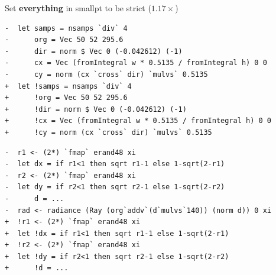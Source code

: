 \documentclass[8pt]{beamer}
\begin{document}
\begin{frame}[fragile]{Set \textbf{everything} in smallpt to be strict ($1.17\times$)}
\begin{verbatim}
-  let samps = nsamps `div` 4
-      org = Vec 50 52 295.6
-      dir = norm $ Vec 0 (-0.042612) (-1)
-      cx = Vec (fromIntegral w * 0.5135 / fromIntegral h) 0 0
-      cy = norm (cx `cross` dir) `mulvs` 0.5135
+  let !samps = nsamps `div` 4
+      !org = Vec 50 52 295.6
+      !dir = norm $ Vec 0 (-0.042612) (-1)
+      !cx = Vec (fromIntegral w * 0.5135 / fromIntegral h) 0 0
+      !cy = norm (cx `cross` dir) `mulvs` 0.5135
\end{verbatim}

\begin{verbatim}
-  r1 <- (2*) `fmap` erand48 xi
-  let dx = if r1<1 then sqrt r1-1 else 1-sqrt(2-r1)
-  r2 <- (2*) `fmap` erand48 xi
-  let dy = if r2<1 then sqrt r2-1 else 1-sqrt(2-r2)
-      d = ...
-  rad <- radiance (Ray (org`addv`(d`mulvs`140)) (norm d)) 0 xi
+  !r1 <- (2*) `fmap` erand48 xi
+  let !dx = if r1<1 then sqrt r1-1 else 1-sqrt(2-r1)
+  !r2 <- (2*) `fmap` erand48 xi
+  let !dy = if r2<1 then sqrt r2-1 else 1-sqrt(2-r2)
+      !d = ...
\end{verbatim}
\end{frame}

\end{document}
